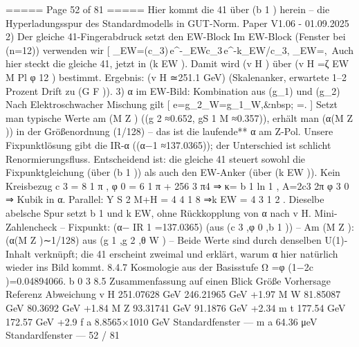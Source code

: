 \begin{MyVerbatim}
{{===== Page 52 of 81 =====
Hier kommt die 41 über (b 1 ) herein – die Hyperladungsspur des Standardmodells in GUT-Norm.
Paper V1.06 - 01.09.2025
2) Der gleiche 41-Fingerabdruck setzt den EW-Block
Im EW-Block (Fenster bei (n=12)) verwenden wir
[ \zeta_{\rm EW}=(\pi c_3)\,\mathrm e^{-\beta_{\rm EW}\pi c_3}\,\mathrm e^{-k_{\rm EW}/c_3}, \quad \beta_{\rm EW}=,\
Auch hier steckt die gleiche 41, jetzt in (k EW ). Damit wird (v H ) über (v H =ζ EW M Pl φ 12 ) bestimmt.
Ergebnis: (v H ≃251.1 GeV) (Skalenanker, erwartete 1–2 Prozent Drift zu (G F )).
3) α im EW-Bild: Kombination aus (g_1) und (g_2)
Nach Elektroschwacher Mischung gilt
[ e=g_2\sin\theta_W=g_1\cos\theta_W,\qquad&nbsp; \alpha=. ]
Setzt man typische Werte am (M Z ) ((g 2 ≈0.652, gS 1 M ≈0.357)), erhält man (α(M Z )) in der Größenordnung (1/128) –
das ist die laufende** α am Z-Pol.
Unsere Fixpunktlösung gibt die IR-α ((α−1 ≈137.0365)); der Unterschied ist schlicht Renormierungsfluss. Entscheidend
ist: die gleiche 41 steuert sowohl die Fixpunktgleichung (über (b 1 )) als auch den EW-Anker (über (k EW )).
Kein Kreisbezug
c 3 = 8 1 π , φ 0 = 6 1 π + 256 3 π4
⇒ κ= b 1 ln 1 , A=2c3
2π φ 3
0
⇒ Kubik in α.
Parallel: Y S 2 M+H = 4 4 1 8 ⇒k EW = 4 3 1 2 .
Dieselbe abelsche Spur setzt b 1 und k EW, ohne Rückkopplung von α nach v H.
Mini-Zahlencheck
– Fixpunkt: (α− IR 1 =137.0365) (aus (c 3 ,φ 0 ,b 1 ))
– Am (M Z ): (α(M Z )∼1/128) aus (g 1 ,g 2 ,θ W )
– Beide Werte sind durch denselben U(1)-Inhalt verknüpft; die 41 erscheint zweimal und erklärt, warum α hier
natürlich wieder ins Bild kommt.
8.4.7 Kosmologie aus der Basisstufe
Ω =φ (1−2c )=0.04894066.
b 0 3
8.5 Zusammenfassung auf einen Blick
Größe Vorhersage Referenz Abweichung
v H 251.07628 GeV 246.21965 GeV +1.97 %
M W 81.85087 GeV 80.3692 GeV +1.84 %
M Z 93.31741 GeV 91.1876 GeV +2.34 %
m t 177.54 GeV 172.57 GeV +2.9 %
f a 8.8565×1010 GeV Standardfenster —
m a 64.36 μeV Standardfenster —
52 / 81

}}
\end{MyVerbatim}
